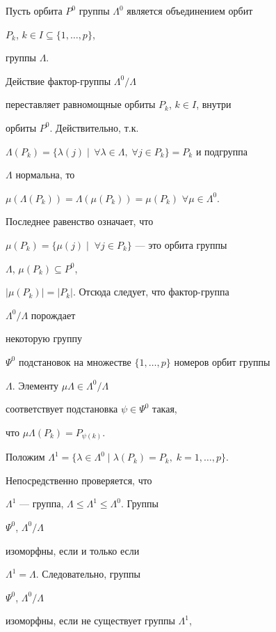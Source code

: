 \begin{pf}


Пусть орбита $P^0$ группы $\Lambda^0$ является объединением орбит


$P_k$, $k\in I\subseteq\{1,\dotsc,p\}$,


группы $\Lambda$.


Действие фактор-группы $\Lambda^0/\Lambda$


переставляет равномощные орбиты $P_k$, $k\in I$, внутри


орбиты $P^0$. Действительно, т.к.


$\Lambda(P_k)=\{\lambda(j)\mid\,\forall\lambda\in\Lambda,\;


\forall j\in P_k\}=P_k$ и подгруппа


$\Lambda$ нормальна, то


$\mu(\Lambda(P_k))=\Lambda(\mu(P_k))=\mu(P_k)$ $\forall\mu\in\Lambda^0$.


Последнее равенство означает, что


$\mu(P_k)=\{\mu(j)\mid\;\forall j\in P_k\}$ --- это орбита группы


$\Lambda$, $\mu(P_k)\subseteq P^0$,


$|\mu(P_k)|=|P_k|$. Отсюда следует, что фактор-группа


$\Lambda^0/\Lambda$ порождает


некоторую группу


$\Psi^0$ подстановок на множестве $\{1,\dotsc,p\}$ номеров орбит группы


$\Lambda$. Элементу $\mu\Lambda\in\Lambda^0/\Lambda$


соответствует подстановка $\psi\in\Psi^0$ такая,


что $\mu\Lambda(P_k)=P_{\psi(k)}$.





Положим $\Lambda^1=\{\lambda\in\Lambda^0\mid\lambda(P_k)=P_k,\;


k=1,\dotsc,p\}$.


Непосредственно проверяется, что


$\Lambda^1$ --- группа, $\Lambda\le\Lambda^1\le\Lambda^0$. Группы


$\Psi^0$, $\Lambda^0/\Lambda$


изоморфны, если и только если


$\Lambda^1=\Lambda$. Следовательно, группы


$\Psi^0$, $\Lambda^0/\Lambda$


изоморфны, если не существует группы $\Lambda^1$,



\end{pf}
